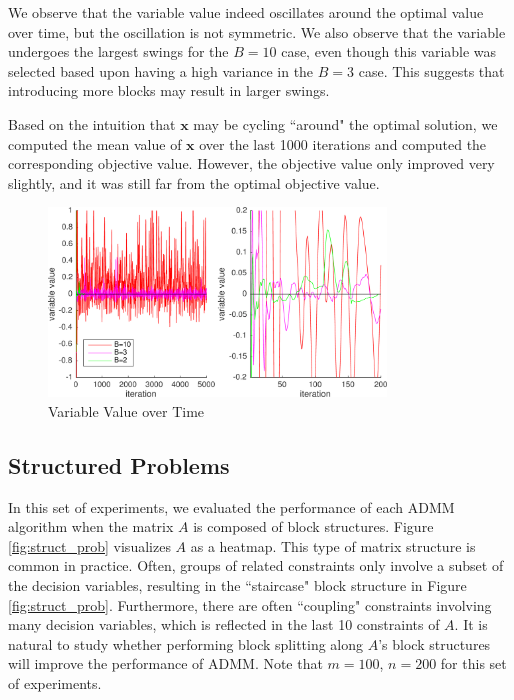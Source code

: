 \documentclass{article}
\begin{document}
{We observe that the variable value indeed oscillates around the optimal value over time, but the oscillation is not symmetric. We also observe that the variable undergoes the largest swings for the $B=10$ case, even though this variable was selected based upon having a high variance in the $B=3$ case. This suggests that introducing more blocks may result in larger swings.

Based on the intuition that $\mathbf{x}$ may be cycling ``around" the optimal solution, we computed the mean value of $\mathbf{x}$ over the last 1000 iterations and computed the corresponding objective value. However, the objective value only improved very slightly, and it was still far from the optimal objective value. 

\begin{figure}[h]
	\centering
	\includegraphics[width=0.8\textwidth]{../figures/variable_cycling_analysis.png}
	\caption{Variable Value over Time}
	\label{fig:x_over_time}
\end{figure}




\subsection*{Structured Problems}
In this set of experiments, we evaluated the performance of each ADMM algorithm when the matrix $A$ is composed of block structures. Figure \ref{fig:struct_prob} visualizes $A$ as a heatmap. This type of matrix structure is common in practice. Often, groups of related constraints only involve a subset of the decision variables, resulting in the ``staircase" block structure in Figure \ref{fig:struct_prob}. Furthermore, there are often ``coupling" constraints involving many decision variables, which is reflected in the last 10 constraints of $A$. It is natural to study whether performing block splitting along $A$'s block structures will improve the performance of ADMM. Note that $m=100$, $n=200$ for this set of experiments. 

}
\end{document}
